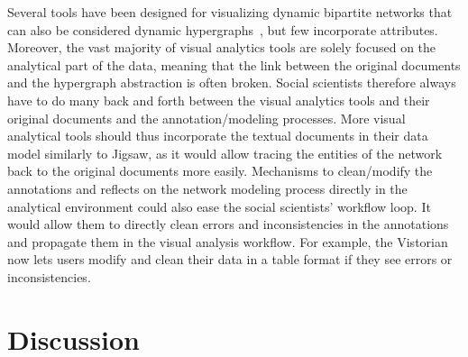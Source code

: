 Several tools have been designed for visualizing dynamic bipartite networks that can also be considered dynamic hypergraphs~\cite{valdiviaAnalyzingDynamicHypergraphs2021, hyperstorylines}, but few incorporate attributes.
Moreover, the vast majority of visual analytics tools are solely focused on the analytical part of the data, meaning that the link between the original documents and the hypergraph abstraction is often broken.
Social scientists therefore always have to do many back and forth between the visual analytics tools and their original documents and the annotation/modeling processes.
More visual analytical tools should thus incorporate the textual documents in their data model similarly to Jigsaw\cite{staskoJigsawSupportingInvestigative2008}, as it would allow tracing the entities of the network back to the original documents more easily.
Mechanisms to clean/modify the annotations and reflects on the network modeling process directly in the analytical environment could also ease the social scientists' workflow loop.
It would allow them to directly clean errors and inconsistencies in the annotations and propagate them in the visual analysis workflow.
For example, the Vistorian\cite{serranomolineroUnderstandingUseVistorian2017} now lets users modify and clean their data in a table format if they see errors or inconsistencies.


\section{Discussion}


